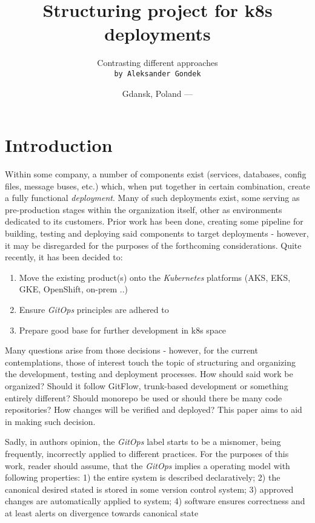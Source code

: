 \documentclass{article}
\title{Structuring project for k8s deployments}
\author{Contrasting different approaches\\ \texttt{by Aleksander Gondek}}
\date{Gdansk, Poland --- \writtenAt}
\begin{document}
\maketitle %


\section*{Introduction} %

Within some company, a number of components exist (services, databases, config files, message buses, etc.) which, when put together in certain combination, create a fully functional \emph{deployment}. 
Many of such deployments exist, some serving as pre-production stages within the organization itself, other as environments dedicated to its customers.
Prior work has been done, creating some pipeline for building, testing and deploying said components to target deployments - however, it may be disregarded for the purposes of the forthcoming considerations. 
\newline\newline
Quite recently, it has been decided to:
\begin{enumerate}
	\item Move the existing product(s) onto the \emph{Kubernetes} platforms (AKS, EKS, GKE, OpenShift, on-prem ..)
	\item Ensure \emph{GitOps} principles are adhered to
	\item Prepare good base for further development in k8s space
\end{enumerate}

Many questions arise from those decisions - however, for the current contemplations, those of interest touch the topic of structuring and organizing the development, testing and deployment processes.
How should said work be organized? Should it follow GitFlow, trunk-based development or something entirely different? Should monorepo be used or should there be many code repositories? How changes will be verified and deployed?
This paper aims to aid in making such decision.

\begin{warn}[Notice:] %
	Sadly, in authors opinion, the \emph{GitOps} label starts to be a misnomer, being frequently, incorrectly applied to different practices.
	For the purposes of this work, reader should assume, that the \emph{GitOps} implies a operating model with following properties: 
	1) the entire system is described declaratively;
	2) the canonical desired stated is stored in some version control system;
	3) approved changes are automatically applied to system;
	4) software ensures correctness and at least alerts on divergence towards canonical state
\end{warn}
\end{document}
